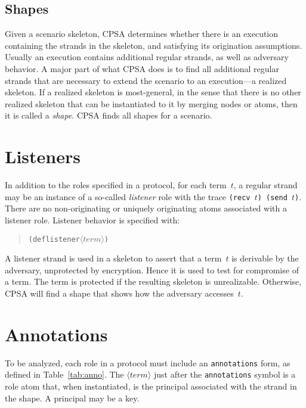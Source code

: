 \documentclass[12pt]{article}
\newcommand{\nterm}[1]{\ensuremath{\langle\mathit{#1}\rangle}}
\begin{document}
\subsection{Shapes}

Given a scenario skeleton, CPSA determines whether there is an execution
containing the strands in the skeleton, and satisfying its
origination assumptions.  Usually an execution contains additional
regular strands, as well as adversary behavior.  A major part of what
CPSA does is to find all additional regular strands that are necessary
to extend the scenario to an execution---a realized skeleton.  If a
realized skeleton is most-general, in the sense that there is no other
realized skeleton that can be instantiated to it by merging nodes or
atoms, then it is called a {\em shape}. CPSA finds all shapes for a
scenario.

\section{Listeners}

In addition to the roles specified in a protocol, for each term~$t$, a
regular strand may be an instance of a so-called {\em listener} role
with the trace \texttt{(recv~$t$) (send~$t$)}.  There are no
non-originating or uniquely originating atoms associated with a
listener role.  Listener behavior is specified with:
\begin{quote}
\begin{alltt}
(deflistener \nterm{term})
\end{alltt}
\end{quote}

A listener strand is used in a skeleton to assert that a term~$t$ is
derivable by the adversary, unprotected by encryption.  Hence it is used
to test for compromise of a term.  The term is protected if the
resulting skeleton is unrealizable.  Otherwise, CPSA will find a shape
that shows how the adversary accesses~$t$.

\iffalse
\section{Annotations}

To be analyzed, each role in a protocol must include an
\texttt{annotations} form, as defined in Table~\ref{tab:anno}.  The
\nterm{term} just after the \texttt{annotations} symbol is a role atom
that, when instantiated, is the principal associated with the strand in
the shape.  A principal may be a key.
\end{document}
